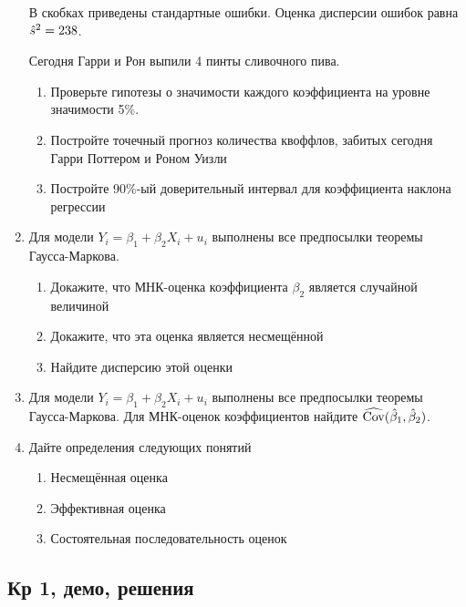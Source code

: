 \documentclass[12pt, a4paper]{article}\usepackage[]{graphicx}\usepackage[]{color}
\begin{document}
\begin{enumerate}
В скобках приведены стандартные ошибки. Оценка дисперсии ошибок равна $\hat{s}^2 = 238$.

Сегодня Гарри и Рон выпили 4 пинты сливочного пива.

\begin{enumerate}
\item Проверьте гипотезы о значимости каждого коэффициента на уровне значимости 5\%.
\item Постройте точечный прогноз количества квоффлов, забитых сегодня Гарри Поттером и Роном Уизли
\item Постройте 90\%-ый доверительный интервал для коэффициента наклона регрессии
\end{enumerate}



\item Для модели $Y_i = \beta_1 + \beta_2 X_i + u_i$ выполнены все предпосылки теоремы Гаусса-Маркова.
\begin{enumerate}
\item Докажите, что МНК-оценка коэффициента $\beta_2$ является случайной величиной
\item Докажите, что эта оценка является несмещённой
\item Найдите дисперсию этой оценки
\end{enumerate}



\item Для модели $Y_i = \beta_1 + \beta_2 X_i + u_i$ выполнены все предпосылки теоремы Гаусса-Маркова. Для МНК-оценок коэффициентов найдите $\widehat{\operatorname{Cov}}(\hat{\beta}_1, \hat{\beta}_2)$.


\item Дайте определения следующих понятий
\begin{enumerate}
\item Несмещённая оценка
\item Эффективная оценка
\item Состоятельная последовательность оценок
\end{enumerate}



\end{enumerate}

\subsection{Кр 1, демо, решения}
\end{document}

